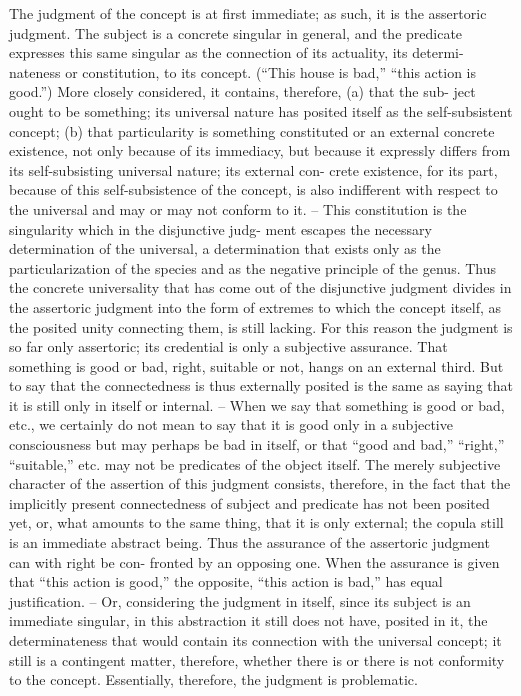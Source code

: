 The judgment of the concept is at first immediate; as such, it is the assertoric
judgment. The subject is a concrete singular in general, and the predicate
expresses this same singular as the connection of its actuality, its determi-
nateness or constitution, to its concept. (“This house is bad,” “this action
is good.”) More closely considered, it contains, therefore, (a) that the sub-
ject ought to be something; its universal nature has posited itself as the
self-subsistent concept; (b) that particularity is something constituted or an
external concrete existence, not only because of its immediacy, but because it
expressly differs from its self-subsisting universal nature; its external con-
crete existence, for its part, because of this self-subsistence of the concept, is
also indifferent with respect to the universal and may or may not conform
to it. – This constitution is the singularity which in the disjunctive judg-
ment escapes the necessary determination of the universal, a determination
that exists only as the particularization of the species and as the negative
principle of the genus. Thus the concrete universality that has come out
of the disjunctive judgment divides in the assertoric judgment into the
form of extremes to which the concept itself, as the posited unity connecting
them, is still lacking.
For this reason the judgment is so far only assertoric; its credential is only
a subjective assurance. That something is good or bad, right, suitable or
not, hangs on an external third. But to say that the connectedness is thus
externally posited is the same as saying that it is still only in itself or internal. –
When we say that something is good or bad, etc., we certainly do not mean
to say that it is good only in a subjective consciousness but may perhaps
be bad in itself, or that “good and bad,” “right,” “suitable,” etc. may not
be predicates of the object itself. The merely subjective character of the
assertion of this judgment consists, therefore, in the fact that the implicitly
present connectedness of subject and predicate has not been posited yet, or,
what amounts to the same thing, that it is only external; the copula still is
an immediate abstract being.
Thus the assurance of the assertoric judgment can with right be con-
fronted by an opposing one. When the assurance is given that “this action
is good,” the opposite, “this action is bad,” has equal justification. – Or,
considering the judgment in itself, since its subject is an immediate singular,
in this abstraction it still does not have, posited in it, the determinateness
that would contain its connection with the universal concept; it still is a
contingent matter, therefore, whether there is or there is not conformity to
the concept. Essentially, therefore, the judgment is problematic.

